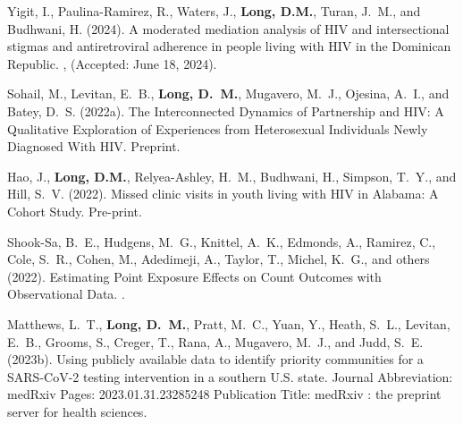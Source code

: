 \begin{thebibliography}{}
Yigit, I., Paulina-Ramirez, R., Waters, J., \textbf{Long, D.M.}, Turan, J.~M., and
  Budhwani, H. (2024).
\newblock A moderated mediation analysis of {HIV} and intersectional stigmas
  and antiretroviral adherence in people living with {HIV} in the {Dominican}
  {Republic}.
, (Accepted: June 18, 2024).




Sohail, M., Levitan, E.~B., \textbf{Long, D.~M.}, Mugavero, M.~J., Ojesina, A.~I., and
  Batey, D.~S. (2022a).
\newblock The {Interconnected} {Dynamics} of {Partnership} and {HIV}: {A}
  {Qualitative} {Exploration} of {Experiences} from {Heterosexual}
  {Individuals} {Newly} {Diagnosed} {With} {HIV}.
\newblock Preprint.

Hao, J., \textbf{Long, D.M.}, Relyea-Ashley, H.~M., Budhwani, H., Simpson, T.~Y., and
  Hill, S.~V. (2022).
\newblock Missed clinic visits in youth living with {HIV} in {Alabama}: {A}
  {Cohort} {Study}.
\newblock Pre-print.

Shook-Sa, B.~E., Hudgens, M.~G., Knittel, A.~K., Edmonds, A., Ramirez, C.,
  Cole, S.~R., Cohen, M., Adedimeji, A., Taylor, T., Michel, K.~G., and
  {others} (2022).
\newblock Estimating {Point} {Exposure} {Effects} on {Count} {Outcomes} with
  {Observational} {Data}.
.

Matthews, L.~T., \textbf{Long, D.~M.}, Pratt, M.~C., Yuan, Y., Heath, S.~L., Levitan,
  E.~B., Grooms, S., Creger, T., Rana, A., Mugavero, M.~J., and Judd, S.~E.
  (2023b).
\newblock Using publicly available data to identify priority communities for a
  {SARS}-{CoV}-2 testing intervention in a southern {U}.{S}. state.
\newblock Journal Abbreviation: medRxiv Pages: 2023.01.31.23285248 Publication
  Title: medRxiv : the preprint server for health sciences.

\end{thebibliography}
